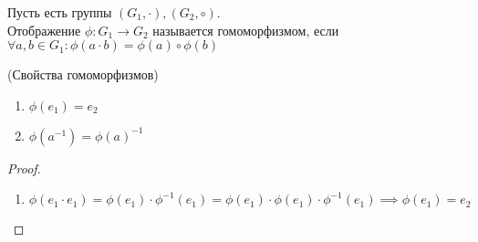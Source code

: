 \begin{definition}
    \label{def2.4}
    Пусть есть группы $(G_1, \cdot), (G_2, \circ)$. \\ 
    Отображение $\phi: G_1 \rightarrow G_2$ называется гомоморфизмом, если $\forall a, b \in G_1: \phi(a \cdot b) = \phi(a) \circ \phi(b)$
\end{definition}

\begin{proposition}(Свойства гомоморфизмов)
    \begin{enumerate}
        \item $\phi(e_1) = e_2$
        \item $\phi(a^{-1}) = \phi(a)^{-1}$
    \end{enumerate}
\end{proposition}

\begin{proof}~
    \begin{enumerate}
        \item $\phi(e_1 \cdot e_1) = \phi(e_1) \cdot {\phi}^{-1}(e_1) = \phi(e_1) \cdot \phi(e_1) \cdot {\phi}^{-1}(e_1) 
        \implies \phi(e_1) = e_2$
    \end{enumerate}
\end{proof}

